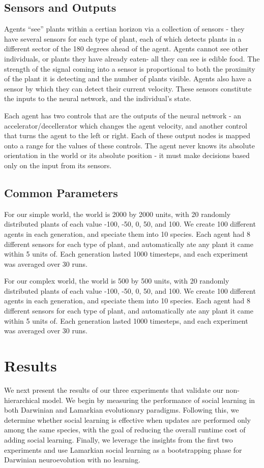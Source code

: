 \documentclass{acm_proc_article-sp}
\begin{document}
\subsection*{Sensors and Outputs} 

  Agents ``see'' plants within a certian horizon via a collection of sensors - they have several sensors for each type of plant, each of which detects plants in a different sector of the 180 degrees ahead of the agent.  Agents cannot see other individuals, or plants they have already eaten- all they can see is edible food.  The strength of the signal coming into a sensor is proportional to both the proximity of the plant it is detecting and the number of plants visible. Agents also have a sensor by which they can detect their current velocity. These sensors constitute the inputs to the neural network, and the individual's state.
  
   Each agent has two controls that are the outputs of the neural network - an accelerator/decellerator which changes the agent velocity, and another control that turns the agent to the left or right. Each of these output nodes is mapped onto a range for the values of these controls.  The agent never knows its absolute orientation in the world or its absolute position - it must make decisions based only on the input from its sensors.

\subsection*{Common Parameters} 

For our simple world, the world is 2000 by 2000 units, with 20 randomly distributed plants of each value -100, -50, 0, 50, and 100. We create 100 different agents in each generation, and speciate them into 10 species. Each agent had 8 different sensors for each type of plant, and automatically ate any plant it came within 5 units of. Each generation lasted 1000 timesteps, and each experiment was averaged over 30 runs.

For our complex world, the world is 500 by 500 units, with 20 randomly distributed plants of each value -100, -50, 0, 50, and 100. We create 100 different agents in each generation, and speciate them into 10 species. Each agent had 8 different sensors for each type of plant, and automatically ate any plant it came within 5 units of. Each generation lasted 1000 timesteps, and each experiment was averaged over 30 runs.

\section{Results}
\label{sec:results}
We next present the results of our three experiments that validate our non-hierarchical model. We begin by measuring the performance of social learning in both Darwinian and Lamarkian evolutionary paradigms. Following this, we determine whether social learning is effective when updates are performed only among the same species, with the goal of reducing the overall runtime cost of adding social learning. Finally, we leverage the insights from the first two experiments and use Lamarkian social learning as a bootstrapping phase for Darwinian neuroevolution with no learning.
\end{document}
